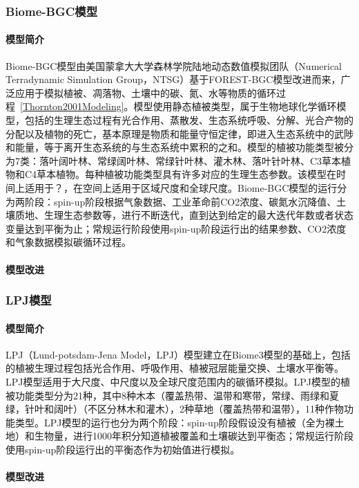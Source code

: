 \subsubsection{Biome-BGC模型}
\paragraph{模型简介} Biome-BGC模型由美国蒙拿大大学森林学院陆地动态数值模拟团队（Numerical Terradynamic Simulation Group，NTSG）基于FOREST-BGC模型改进而来，广泛应用于模拟植被、凋落物、土壤中的碳、氮、水等物质的循环过程~\ref{Thornton2001Modeling}。模型使用静态植被类型，属于生物地球化学循环模型，包括的生理生态过程有光合作用、蒸散发、生态系统呼吸、分解、光合产物的分配以及植物的死亡，基本原理是物质和能量守恒定律，即进入生态系统中的武陟和能量，等于离开生态系统的与生态系统中累积的之和。模型的植被功能类型被分为7类：落叶阔叶林、常绿阔叶林、常绿针叶林、灌木林、落叶针叶林、C3草本植物和C4草本植物。每种植被功能类型具有许多对应的生理生态参数。该模型在时间上适用于？，在空间上适用于区域尺度和全球尺度。Biome-BGC模型的运行分为两阶段：spin-up阶段根据气象数据、工业革命前CO2浓度、碳氮水沉降值、土壤质地、生理生态参数等，进行不断迭代，直到达到给定的最大迭代年数或者状态变量达到平衡为止；常规运行阶段使用spin-up阶段运行出的结果参数、CO2浓度和气象数据模拟碳循环过程。

\paragraph{模型改进} 

\subsubsection{LPJ模型}
\paragraph{模型简介} LPJ（Lund-potsdam-Jena Model，LPJ）模型建立在Biome3模型的基础上，包括的植被生理过程包括光合作用、呼吸作用、植被冠层能量交换、土壤水平衡等。LPJ模型适用于大尺度、中尺度以及全球尺度范围内的碳循环模拟。LPJ模型的植被功能类型分为21种，其中8种木本（覆盖热带、温带和寒带，常绿、雨绿和夏绿，针叶和阔叶）（不区分林木和灌木），2种草地（覆盖热带和温带），11种作物功能类型。LPJ模型的运行也分为两个阶段：spin-up阶段假设没有植被（全为裸土地）和生物量，进行1000年积分知道植被覆盖和土壤碳达到平衡态；常规运行阶段使用spin-up阶段运行出的平衡态作为初始值进行模拟。

\paragraph{模型改进} 

